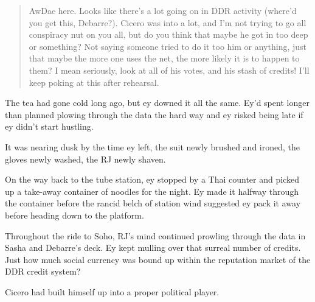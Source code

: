 \begin{quote}
AwDae here. Looks like there's a lot going on in DDR activity (where'd you get this, Debarre?). Cicero was into a lot, and I'm not trying to go all conspiracy nut on you all, but do you think that maybe he got in too deep or something? Not saying someone tried to do it too him or anything, just that maybe the more one uses the net, the more likely it is to happen to them? I mean seriously, look at all of his votes, and his stash of credits! I'll keep poking at this after rehearsal.
\end{quote}

The tea had gone cold long ago, but ey downed it all the same. Ey'd spent longer than planned plowing through the data the hard way and ey risked being late if ey didn't start hustling.

It was nearing dusk by the time ey left, the suit newly brushed and ironed, the gloves newly washed, the RJ newly shaven.

On the way back to the tube station, ey stopped by a Thai counter and picked up a take-away container of noodles for the night. Ey made it halfway through the container before the rancid belch of station wind suggested ey pack it away before heading down to the platform.

Throughout the ride to Soho, RJ's mind continued prowling through the data in Sasha and Debarre's deck. Ey kept mulling over that surreal number of credits. Just how much social currency was bound up within the reputation market of the DDR credit system?

Cicero had built himself up into a proper political player.
